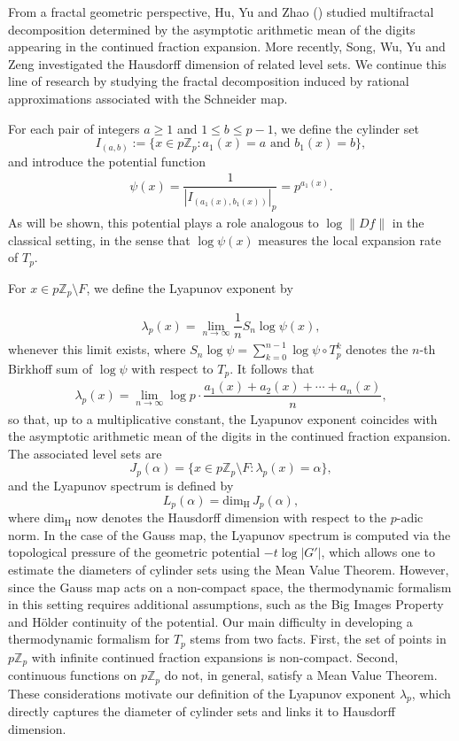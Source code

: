 \documentclass[11pt]{amsart}
\theoremstyle{remark}
\numberwithin{equation}{section}
\newcommand{\Z}{\mathbb{Z}}
\begin{document}
  From a fractal geometric perspective, Hu, Yu and Zhao (\cite{hyz}) studied multifractal decomposition determined by the asymptotic arithmetic mean of the digits appearing in the continued fraction expansion. More recently, Song, Wu, Yu and Zeng \cite{swyz} investigated the Hausdorff dimension of related level sets. We continue this line of research by studying the fractal decomposition induced by rational approximations associated with the Schneider map.

For each pair of integers $a\geq 1$ and $1\leq b\leq p-1$, we define the cylinder set 
  $$I_{(a,b)}:=\{x\in p\Z_p:a_{1}(x)=a \text{ and $b_{1}(x)=b$}\},$$
  and introduce the potential function
\begin{align*}
    \psi(x)=\dfrac{1}{\left|I_{(a_{1}(x),b_{1}(x))}\right|_{p}}=p^{a_{1}(x)}.
\end{align*} 
As will be shown, this potential plays a role analogous to $\log\|Df\|$ in the classical setting, in the sense that $\log \psi(x)$ measures the local expansion rate of $T_p$. 

For $x\in p\Z_p\setminus F$, we define the Lyapunov exponent by

\begin{align*}
     \lambda_{p}(x)=\lim_{n\rightarrow{\infty}}\dfrac{1}{n}S_{n}\log\psi (x),
\end{align*} 
whenever this limit exists, where $S_n\log\psi=\sum^{n-1}_{k=0}\log\psi\circ T^{k}_{p}$ denotes the $n$-th Birkhoff sum of $\log\psi$ with respect to $T_{p}$.  It follows that
\begin{align}
    \lambda_{p}(x)=\lim_{n\rightarrow{\infty}}\log p \cdot \dfrac{a_{1}(x)+a_{2}(x)+\cdots +a_{n}(x)}{n},
\end{align} 
so that, up to a multiplicative constant, the Lyapunov exponent coincides with the asymptotic arithmetic mean of the digits in the continued fraction expansion. The associated level sets are $$J_{p}(\alpha)=\{x\in p\Z_{p}\setminus F: \lambda_{p}(x)=\alpha\},$$ and the Lyapunov spectrum is defined by $$L_{p}(\alpha)=\mathrm{dim}_{\mathrm{H}}\,J_{p}(\alpha),$$ where $\mathrm{dim}_{\mathrm{H}}$ now denotes the Hausdorff dimension with respect to the $p$-adic norm. In the case of the Gauss map, the Lyapunov spectrum is computed via the topological pressure of the geometric potential $-t\log|G'|$, which allows one to estimate the diameters of cylinder sets using the Mean Value Theorem. However, since the Gauss map acts on a non-compact space, the thermodynamic formalism in this setting requires additional assumptions, such as the Big Images Property and H\"older continuity of the potential. Our main difficulty in developing a thermodynamic formalism for $T_p$ stems from two facts. First, the set of points in $p\Z_p$ with infinite continued fraction expansions is non-compact. Second, continuous functions on $p\Z_p$ do not, in general, satisfy a Mean Value Theorem. These considerations motivate our definition of the Lyapunov exponent $\lambda_p$, which directly captures the diameter of cylinder sets and links it to Hausdorff dimension.
\end{document}
